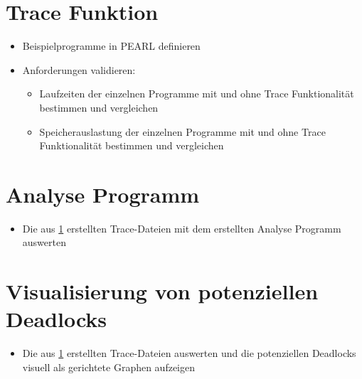 \section{Trace Funktion}\label{Validierung:Trace Funktion}
\begin{itemize}
  \item Beispielprogramme in PEARL definieren
  \item Anforderungen validieren:
  \begin{itemize}
    \item Laufzeiten der einzelnen Programme mit und ohne Trace Funktionalität
    bestimmen und vergleichen
    \item Speicherauslastung der einzelnen Programme mit und ohne Trace
    Funktionalität bestimmen und vergleichen
  \end{itemize}
\end{itemize}

\section{Analyse Programm}
\begin{itemize}
  \item Die aus \cref{Validierung:Trace Funktion} erstellten Trace-Dateien mit
  dem erstellten Analyse Programm auswerten
\end{itemize}

\section{Visualisierung von potenziellen Deadlocks}
\begin{itemize}
  \item Die aus \cref{Validierung:Trace Funktion} erstellten Trace-Dateien
  auswerten und die potenziellen Deadlocks visuell als gerichtete Graphen
  aufzeigen
\end{itemize}